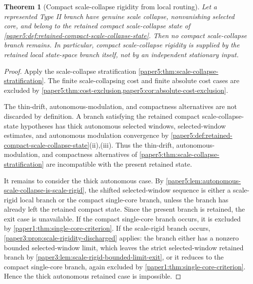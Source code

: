 \documentclass[11pt]{amsart}
\theoremstyle{plain}
\newtheorem{theorem}{Theorem}[section]
\theoremstyle{definition}
\theoremstyle{remark}
\begin{document}
\begin{theorem}[Compact scale-collapse rigidity from local routing]
\label{paper5:thm:compact-scale-collapse-rigidity-discharged}
Let a represented Type II branch have genuine scale collapse, nonvanishing
selected core, and belong to the retained compact scale-collapse state of
\cref{paper5:def:retained-compact-scale-collapse-state}.  Then no compact
scale-collapse branch remains.  In particular, compact scale-collapse rigidity
is supplied by the retained local state-space branch itself, not by an
independent stationary input.
\end{theorem}

\begin{proof}
Apply the scale-collapse stratification
\cref{paper5:thm:scale-collapse-stratification}.  The finite scale-collapsing
cost and finite absolute cost cases are excluded by
\cref{paper5:thm:cost-exclusion,paper5:cor:absolute-cost-exclusion}.

The thin-drift, autonomous-modulation, and compactness alternatives are not
discarded by definition.  A branch satisfying the retained compact
scale-collapse-state hypotheses has thick autonomous selected windows,
selected-window estimates, and autonomous modulation convergence by
\cref{paper5:def:retained-compact-scale-collapse-state}\textup{(ii),(iii)}.
Thus the thin-drift, autonomous-modulation, and compactness alternatives of
\cref{paper5:thm:scale-collapse-stratification} are incompatible with the
present retained state.

It remains to consider the thick autonomous case.  By
\cref{paper5:lem:autonomous-scale-collapse-is-scale-rigid}, the shifted
selected-window sequence is either a scale-rigid local branch or the compact
single-core branch, unless the branch has already left the retained compact
state.  Since the present branch is retained, the exit case is unavailable.  If
the compact single-core branch occurs, it is excluded by
\cref{paper1:thm:single-core-criterion}.  If the scale-rigid branch occurs,
\cref{paper3:prop:scale-rigidity-discharged} applies: the branch either has a
nonzero bounded selected-window limit, which leaves the strict
selected-window retained branch by
\cref{paper3:lem:scale-rigid-bounded-limit-exit}, or it reduces
to the compact single-core branch, again excluded by
\cref{paper1:thm:single-core-criterion}.  Hence the thick autonomous retained
case is impossible.

\end{proof}
\end{document}
